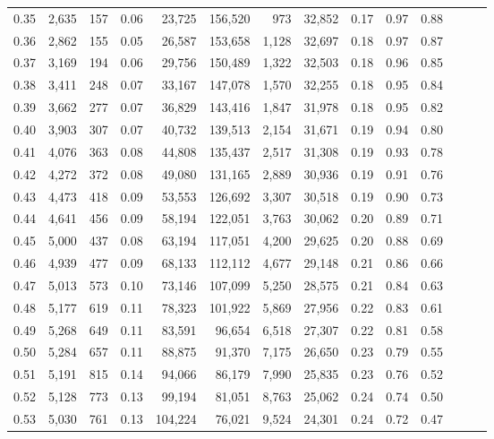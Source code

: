 \begin{tabular}{rrrrrrrrrrrrrr}
0.35 &  2,635 &  157 &  0.06 &   23,725 &  156,520 &     973 &  32,852 &  0.17 &  0.97 &      0.88 \\
0.36 &  2,862 &  155 &  0.05 &   26,587 &  153,658 &   1,128 &  32,697 &  0.18 &  0.97 &      0.87 \\
0.37 &  3,169 &  194 &  0.06 &   29,756 &  150,489 &   1,322 &  32,503 &  0.18 &  0.96 &      0.85 \\
0.38 &  3,411 &  248 &  0.07 &   33,167 &  147,078 &   1,570 &  32,255 &  0.18 &  0.95 &      0.84 \\
0.39 &  3,662 &  277 &  0.07 &   36,829 &  143,416 &   1,847 &  31,978 &  0.18 &  0.95 &      0.82 \\
0.40 &  3,903 &  307 &  0.07 &   40,732 &  139,513 &   2,154 &  31,671 &  0.19 &  0.94 &      0.80 \\
0.41 &  4,076 &  363 &  0.08 &   44,808 &  135,437 &   2,517 &  31,308 &  0.19 &  0.93 &      0.78 \\
0.42 &  4,272 &  372 &  0.08 &   49,080 &  131,165 &   2,889 &  30,936 &  0.19 &  0.91 &      0.76 \\
0.43 &  4,473 &  418 &  0.09 &   53,553 &  126,692 &   3,307 &  30,518 &  0.19 &  0.90 &      0.73 \\
0.44 &  4,641 &  456 &  0.09 &   58,194 &  122,051 &   3,763 &  30,062 &  0.20 &  0.89 &      0.71 \\
0.45 &  5,000 &  437 &  0.08 &   63,194 &  117,051 &   4,200 &  29,625 &  0.20 &  0.88 &      0.69 \\
0.46 &  4,939 &  477 &  0.09 &   68,133 &  112,112 &   4,677 &  29,148 &  0.21 &  0.86 &      0.66 \\
0.47 &  5,013 &  573 &  0.10 &   73,146 &  107,099 &   5,250 &  28,575 &  0.21 &  0.84 &      0.63 \\
0.48 &  5,177 &  619 &  0.11 &   78,323 &  101,922 &   5,869 &  27,956 &  0.22 &  0.83 &      0.61 \\
0.49 &  5,268 &  649 &  0.11 &   83,591 &   96,654 &   6,518 &  27,307 &  0.22 &  0.81 &      0.58 \\
0.50 &  5,284 &  657 &  0.11 &   88,875 &   91,370 &   7,175 &  26,650 &  0.23 &  0.79 &      0.55 \\
0.51 &  5,191 &  815 &  0.14 &   94,066 &   86,179 &   7,990 &  25,835 &  0.23 &  0.76 &      0.52 \\
0.52 &  5,128 &  773 &  0.13 &   99,194 &   81,051 &   8,763 &  25,062 &  0.24 &  0.74 &      0.50 \\
0.53 &  5,030 &  761 &  0.13 &  104,224 &   76,021 &   9,524 &  24,301 &  0.24 &  0.72 &      0.47 \\

\end{tabular}
